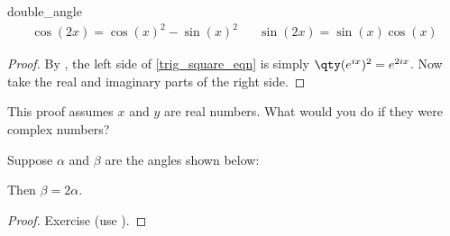 \begin{theorem}{}{double_angle}
\begin{align}
    \cos(2x)=\cos(x)^2-\sin(x)^2 && \sin(2x)=\sin(x)\cos(x)
\end{align}
\end{theorem}
\begin{proof}
By , the left side of \eqref{trig_square_eqn} is simply $\qty(e^{ix})^2=e^{2ix}$. Now take the real and imaginary parts of the right side.
\end{proof}

This proof assumes $x$ and $y$ are real numbers. What would you do if they were complex numbers?

\begin{corollary}{}{}
Suppose $\alpha$ and $\beta$ are the angles shown below:
\begin{center}
    \begin{minipage}{7cm}
    \begin{center}
    \end{center}
    \end{minipage}
    \begin{minipage}{7cm}
    \begin{center}
    \end{center}
    \end{minipage}
\end{center}
\vspace{-5pt} %
Then $\beta=2\alpha$.
\end{corollary}
\begin{proof}
Exercise (use ).
\end{proof}

